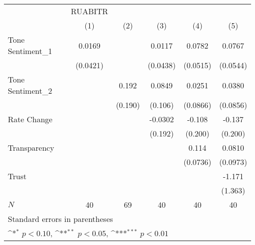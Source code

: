 {
\def\sym#1{\ifmmode^{#1}\else\(^{#1}\)\fi}
\begin{tabular}{l*{5}{c}}
\hline\hline
            &     RUABITR         &                     &                     &                     &                     \\
            &\multicolumn{1}{c}{(1)}         &\multicolumn{1}{c}{(2)}         &\multicolumn{1}{c}{(3)}         &\multicolumn{1}{c}{(4)}         &\multicolumn{1}{c}{(5)}         \\
\hline
Tone Sentiment\_{1}&      0.0169         &                     &      0.0117         &      0.0782         &      0.0767         \\
            &    (0.0421)         &                     &    (0.0438)         &    (0.0515)         &    (0.0544)         \\
[1em]
Tone Sentiment\_{2}&                     &       0.192         &      0.0849         &      0.0251         &      0.0380         \\
            &                     &     (0.190)         &     (0.106)         &    (0.0866)         &    (0.0856)         \\
[1em]
Rate Change &                     &                     &     -0.0302         &      -0.108         &      -0.137         \\
            &                     &                     &     (0.192)         &     (0.200)         &     (0.200)         \\
[1em]
Transparency&                     &                     &                     &       0.114         &      0.0810         \\
            &                     &                     &                     &    (0.0736)         &    (0.0973)         \\
[1em]
Trust       &                     &                     &                     &                     &      -1.171         \\
            &                     &                     &                     &                     &     (1.363)         \\
\hline
\(N\)       &          40         &          69         &          40         &          40         &          40         \\
\hline\hline
\multicolumn{6}{l}{\footnotesize Standard errors in parentheses}\\
\multicolumn{6}{l}{\footnotesize \sym{*} \(p<0.10\), \sym{**} \(p<0.05\), \sym{***} \(p<0.01\)}\\
\end{tabular}
}
